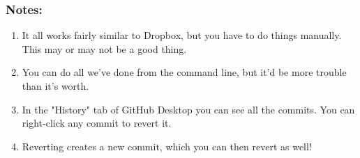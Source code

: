 \documentclass{beamer}
\begin{document}
\begin{frame}
\frametitle{Notes:}
\begin{enumerate}
	\item It all works fairly similar to Dropbox, but you have to do things manually. This may or may not be a good thing.
	\item You can do all we've done from the command line, but it'd be more trouble than it's worth.
	\item In the "History" tab of GitHub Desktop you can see all the commits. You can right-click any commit to revert it. 
	\item Reverting creates a new commit, which you can then revert as well!
\end{enumerate}
\end{frame}






\end{document}
